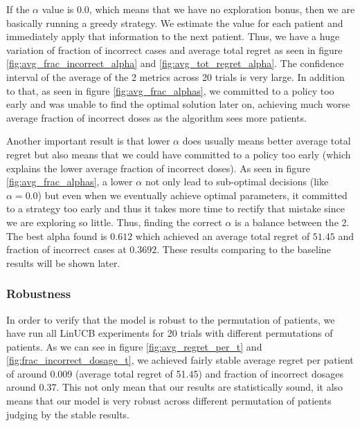 \documentclass{article}
\begin{document}
If the $\alpha$ value is 0.0, which means that we have no exploration bonus, then we are basically running a greedy strategy. We estimate the value for each patient and immediately apply that information to the next patient. Thus, we have a huge variation of fraction of incorrect cases and average total regret as seen in figure \ref{fig:avg_frac_incorrect_alpha} and \ref{fig:avg_tot_regret_alpha}. The confidence interval of the average of the 2 metrics across 20 trials is very large. In addition to that, as seen in figure \ref{fig:avg_frac_alphas}, we committed to a policy too early and was unable to find the optimal solution later on, achieving much worse average fraction of incorrect doses as the algorithm sees more patients.

Another important result is that lower $\alpha$ does usually means better average total regret but also means that we could have committed to a policy too early (which explains the lower average fraction of incorrect doses). As seen in figure \ref{fig:avg_frac_alphas}, a lower $\alpha$ not only lead to sub-optimal decisions (like $\alpha=0.0$) but even when we eventually achieve optimal parameters, it committed to a strategy too early and thus it takes more time to rectify that mistake since we are exploring so little. Thus, finding the correct $\alpha$ is a balance between the 2. The best alpha found is $0.612$ which achieved an average total regret of $51.45$ and fraction of incorrect cases at $0.3692$. These results comparing to the baseline results will be shown later.


\subsubsection{Robustness}
In order to verify that the model is robust to the permutation of patients, we have run all LinUCB experiments for 20 trials with different permutations of patients. As we can see in figure \ref{fig:avg_regret_per_t} and \ref{fig:frac_incorrect_dosage_t}, we achieved fairly stable average regret per patient of around 0.009 (average total regret of 51.45) and fraction of incorrect dosages around 0.37. This not only mean that our results are statistically sound, it also means that our model is very robust across different permutation of patients judging by the stable results.
\end{document}
